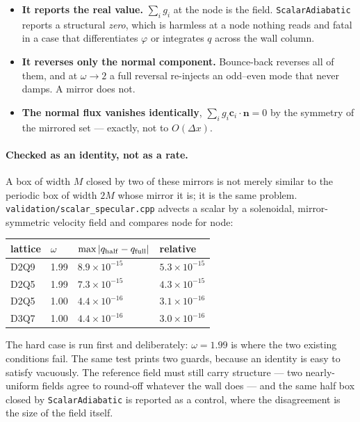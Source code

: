 \documentclass[11pt,a4paper]{article}
\newcommand{\code}[1]{\texttt{\small #1}}
\newcommand{\nn}{\bm{n}}
\begin{document}
\begin{itemize}
  \item \textbf{It reports the real value.} $\sum_i g_i$ at the node is the
  field. \code{ScalarAdiabatic} reports a structural \emph{zero}, which is
  harmless at a node nothing reads and fatal in a case that differentiates
  $\varphi$ or integrates $q$ across the wall column.
  \item \textbf{It reverses only the normal component.} Bounce-back reverses all
  of them, and at $\omega\to2$ a full reversal re-injects an odd--even mode that
  never damps. A mirror does not.
  \item \textbf{The normal flux vanishes identically}, $\sum_i g_i
  \bm{c}_i\!\cdot\!\nn = 0$ by the symmetry of the mirrored set --- exactly, not
  to $O(\Delta x)$.
\end{itemize}

\paragraph{Checked as an identity, not as a rate.} A box of width $M$ closed by
two of these mirrors is not merely similar to the periodic box of width $2M$ whose
mirror it is; it is the same problem. \code{validation/scalar\_specular.cpp}
advects a scalar by a solenoidal, mirror-symmetric velocity field and compares
node for node:

\begin{center}
\begin{tabular}{llll}
\hline
lattice & $\omega$ & $\max|q_{\rm half}-q_{\rm full}|$ & relative \\
\hline
D2Q9 & 1.99 & $8.9\times10^{-15}$ & $5.3\times10^{-15}$ \\
D2Q5 & 1.99 & $7.3\times10^{-15}$ & $4.3\times10^{-15}$ \\
D2Q5 & 1.00 & $4.4\times10^{-16}$ & $3.1\times10^{-16}$ \\
D3Q7 & 1.00 & $4.4\times10^{-16}$ & $3.0\times10^{-16}$ \\
\hline
\end{tabular}
\end{center}

The hard case is run first and deliberately: $\omega=1.99$ is where the two
existing conditions fail. The same test prints two guards, because an identity is
easy to satisfy vacuously. The reference field must still carry structure --- two
nearly-uniform fields agree to round-off whatever the wall does --- and the same
half box closed by \code{ScalarAdiabatic} is reported as a control, where the
disagreement is the size of the field itself.
\end{document}
